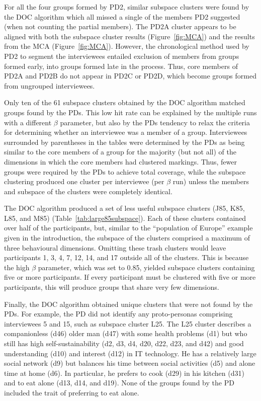 For all the four groups formed by PD2, similar subspace clusters were found by the DOC algorithm which all missed a single of the members PD2 suggested (when not counting the partial members). The PD2A cluster appears to be aligned with both the subspace cluster results (Figure~\ref{fig:MCA}) and the results from the MCA (Figure~\ref{fig:MCA}). However, the chronological method used by PD2 to segment the interviewees entailed exclusion of members from groups formed early, into groups formed late in the process. Thus, core members of PD2A and PD2B do not appear in PD2C or PD2D, which become groups formed from ungrouped interviewees.


Only ten of the 61 subspace clusters obtained by the DOC algorithm matched groups found by the PDs. This low hit rate can be explained by the multiple runs with a different $\beta$ parameter, but also by the PDs tendency to relax the criteria for determining whether an interviewee was a member of a group. Interviewees surrounded by parentheses in the tables were determined by the PDs as being similar to the core members of a group for the majority (but not all) of the dimensions in which the core members had clustered markings. Thus, fewer groups were required by the PDs to achieve total coverage, while the subspace clustering produced one cluster per interviewee (per $\beta$ run) unless the members and subspace of the clusters were completely identical.

The DOC algorithm produced a set of less useful subspace clusters (J85, K85, L85, and M85) (Table~\ref{tab:large85subspace}). Each of these clusters contained over half of the participants, but, similar to the “population of Europe” example given in the introduction, the subspace of the clusters comprised a maximum of three behavioural dimensions. Omitting these trash clusters would leave participants 1, 3, 4, 7, 12, 14, and 17 outside all of the clusters. This is because the high $\beta$ parameter, which was set to 0.85, yielded subspace clusters containing five or more participants. If every participant must be clustered with five or more participants, this will produce groups that share very few dimensions.

Finally, the DOC algorithm obtained unique clusters that were not found by the PDs. For example, the PD did not identify any proto-personas comprising interviewees 5 and 15, such as subspace cluster L25. The L25 cluster describes a companionless (d46) older man (d47) with some health problems (d1) but who still has high self-sustainability (d2, d3, d4, d20, d22, d23, and d42) and good understanding (d10) and interest (d12) in IT technology. He has a relatively large social network (d9) but balances his time between social activities (d5) and alone time at home (d6). In particular, he prefers to cook (d29) in his kitchen (d31) and to eat alone (d13, d14, and d19). None of the groups found by the PD included the trait of preferring to eat alone.

